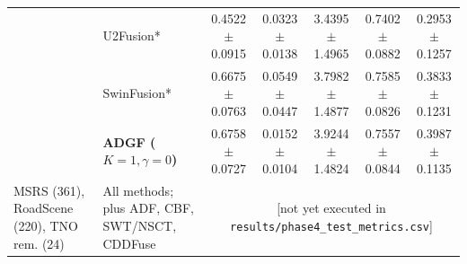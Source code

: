 \documentclass[conference]{IEEEtran}
\begin{document}
\begin{table}[htbp]
\begin{tabular}{llccccc}
& U2Fusion* & 0.4522$\pm$0.0915 & 0.0323$\pm$0.0138 & 3.4395$\pm$1.4965 & 0.7402$\pm$0.0882 & 0.2953$\pm$0.1257 \\
& SwinFusion* & 0.6675$\pm$0.0763 & 0.0549$\pm$0.0447 & 3.7982$\pm$1.4877 & 0.7585$\pm$0.0826 & 0.3833$\pm$0.1231 \\
& \textbf{ADGF ($K=1,\gamma=0$)} & 0.6758$\pm$0.0727 & 0.0152$\pm$0.0104 & 3.9244$\pm$1.4824 & 0.7557$\pm$0.0844 & 0.3987$\pm$0.1135 \\
\midrule
MSRS (361), RoadScene (220), TNO rem. (24) & All methods; plus ADF, CBF, SWT/NSCT, CDDFuse & \multicolumn{5}{c}{[not yet executed in \texttt{results/phase4\_test\_metrics.csv}]} \\
\bottomrule
\end{tabular}
\end{table}
\end{document}
